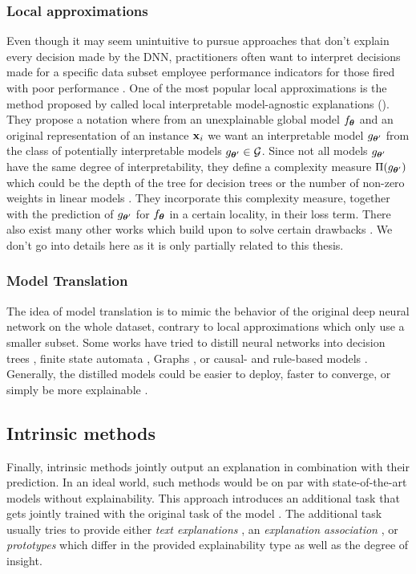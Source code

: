 \subsubsection{Local approximations}
Even though it may seem unintuitive to pursue approaches that don't explain every decision made by the DNN, practitioners often want to interpret decisions made for a specific data subset \eg employee performance indicators for those fired with poor performance \citep{xie2020explainable}. 
One of the most popular local approximations is the method proposed by \citet{Ribeiro0G16} called local interpretable model-agnostic explanations (\lime). They propose a notation where from an unexplainable global model $f_{\boldsymbol{\theta}}$ and an original representation of an instance $\mathbf{x}_i$ we want an interpretable model $g_{\boldsymbol{\theta}^\prime}$ from the class of potentially interpretable models $g_{\boldsymbol{\theta}^\prime} \in \mathcal{G}$. Since not all models $g_{\boldsymbol{\theta}^\prime}$ have the same degree of interpretability, they define a complexity measure $\Pi(g_{\boldsymbol{\theta}^\prime})$ which could be the depth of the tree for decision trees or the number of non-zero weights in linear models \citep{Ribeiro0G16}. They incorporate this complexity measure, together with the prediction of $g_{\boldsymbol{\theta}^\prime}$ for $f_{\boldsymbol{\theta}}$ in a certain locality, in their loss term. There also exist many other works which build upon \lime{} to solve certain drawbacks  \citep{ElenbergDFK17, Ribeiro0G18}. We don't go into details here as it is only partially related to this thesis.

\subsubsection{Model Translation}
The idea of model translation is to mimic the behavior of the original deep neural network on the whole dataset, contrary to local approximations which only use a smaller subset. Some works have tried to distill neural networks into decision trees \citep{FrosstH17, tan2018learning, ZhangYMW19}, finite state automata \citep{HouZ20}, Graphs \citep{ZhangCWZ17, ZhangCSWZ18, ZhangYMW19}, or causal- and rule-based models \citep{harradon2018causal, MurdochS17}. Generally, the distilled models could be easier to deploy, faster to converge, or simply be more explainable \citep{xie2020explainable}.

\subsection{Intrinsic methods}
Finally, intrinsic methods jointly output an explanation in combination with their prediction. In an ideal world, such methods would be on par with state-of-the-art models without explainability. This approach introduces an additional task that gets jointly trained with the original task of the model \citep{xie2020explainable}. The additional task usually tries to provide either \emph{text explanations} \citep{HindWCCDMRV19, CamburuRLB18, HendricksARDSD16, ZellersBFC19}, an \emph{explanation association} \citep{DongSZZ17, LeiBJ16, IyerLL0SS18, Alvarez-MelisJ18}, or \emph{prototypes} \citep{LiLCR18, ChenLTBRS19} which differ in the provided explainability type as well as the degree of insight. 

